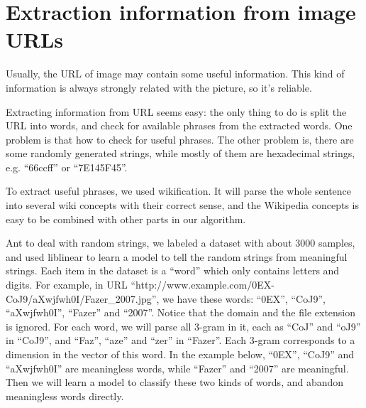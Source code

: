 \section{Extraction information from image URLs}
Usually, the URL of image may contain some useful information. This kind of information is always strongly related with the picture, so it's reliable.

Extracting information from URL seems easy: the only thing to do is split the URL into words, and check for available phrases from the extracted words. One problem is that how to check for useful phrases. The other problem is, there are some randomly generated strings, while mostly of them are hexadecimal strings, e.g. ``66ccff'' or ``7E145F45''.

To extract useful phrases, we used wikification. It will parse the whole sentence into several wiki concepts with their correct sense, and the Wikipedia concepts is easy to be combined with other parts in our algorithm.

Ant to deal with random strings, we labeled a dataset with about 3000 samples, and used liblinear to learn a model to tell the random strings from meaningful strings. Each item in the dataset is a ``word'' which only contains letters and digits. For example, in URL ``http://www.example.com/0EX-CoJ9/aXwjfwh0I/Fazer_2007.jpg'', we have these words: ``0EX'', ``CoJ9'', ``aXwjfwh0I'', ``Fazer'' and ``2007''. Notice that the domain and the file extension is ignored. For each word, we will parse all 3-gram in it, each as ``CoJ'' and ``oJ9'' in ``CoJ9'', and ``Faz'', ``aze'' and ``zer'' in ``Fazer''. Each 3-gram corresponds to a dimension in the vector of this word. In the example below, ``0EX'',  ``CoJ9'' and ``aXwjfwh0I'' are meaningless words, while ``Fazer'' and ``2007'' are meaningful. Then we will learn a model to classify these two kinds of words, and abandon meaningless words directly.
